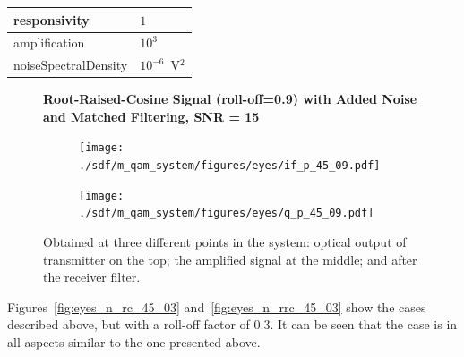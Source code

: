 \begin{refsection}
\begin{table}[H]
\begin{tabular}{|l|l|}
		responsivity           & $1$                                                        \\ \hline
		amplification          & $10^3$                                                     \\ \hline
		noiseSpectralDensity   & $10^{-6}$~V$^2$                             					\\ \hline
	\end{tabular}
\end{table}
\begin{figure}[H]
	\centering
\textbf{Root-Raised-Cosine Signal (roll-off=0.9) with Added Noise and Matched Filtering, SNR = 15}
\begin{minipage}{\linewidth}
	\centering
	\begin{subfigure}{.45\textwidth}
		\centering
		\texttt{[image: ./sdf/m\_qam\_system/figures/eyes/if\_p\_45\_09.pdf]}
	\end{subfigure}
	\begin{subfigure}{.45\textwidth}
		\centering
		\texttt{[image: ./sdf/m\_qam\_system/figures/eyes/q\_p\_45\_09.pdf]}
	\end{subfigure}
	
	\caption{
		Obtained at three different points in the system: optical output of transmitter on the top;
		the amplified signal at the middle; and
		after the receiver filter.
		\label{fig:eyes_n_rrc_45_09}}
	\end{minipage}
\end{figure}


Figures~\ref{fig:eyes_n_rc_45_03} and~\ref{fig:eyes_n_rrc_45_03} show the
cases described above, but with a roll-off factor of 0.3. It can be seen that
the case is in all aspects similar to the one presented above.


\end{refsection}
